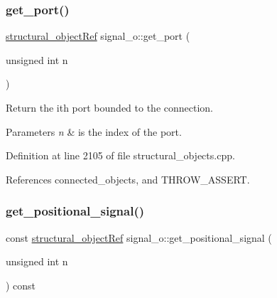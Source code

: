 \mbox{\label{classsignal__o_a3ba0a7224953c8e3cdbd9787f50bd5c0}} 
\subsubsection{\texorpdfstring{get\+\_\+port()}{get\_port()}\hspace{0.1cm}{\footnotesize\ttfamily [2/2]}}
{\footnotesize\ttfamily \hyperlink{structural__objects_8hpp_a8ea5f8cc50ab8f4c31e2751074ff60b2}{structural\+\_\+object\+Ref} signal\+\_\+o\+::get\+\_\+port (\begin{DoxyParamCaption}\item[{unsigned int}]{n }\end{DoxyParamCaption})}



Return the ith port bounded to the connection. 


\begin{DoxyParams}{Parameters}
{\em n} & is the index of the port. \\
\hline
\end{DoxyParams}


Definition at line 2105 of file structural\+\_\+objects.\+cpp.



References connected\+\_\+objects, and T\+H\+R\+O\+W\+\_\+\+A\+S\+S\+E\+RT.

\mbox{\label{classsignal__o_a87c5bca9f6a401ad0c7931689ebf87de}} 
\subsubsection{\texorpdfstring{get\+\_\+positional\+\_\+signal()}{get\_positional\_signal()}}
{\footnotesize\ttfamily const \hyperlink{structural__objects_8hpp_a8ea5f8cc50ab8f4c31e2751074ff60b2}{structural\+\_\+object\+Ref} signal\+\_\+o\+::get\+\_\+positional\+\_\+signal (\begin{DoxyParamCaption}\item[{unsigned int}]{n }\end{DoxyParamCaption}) const}



